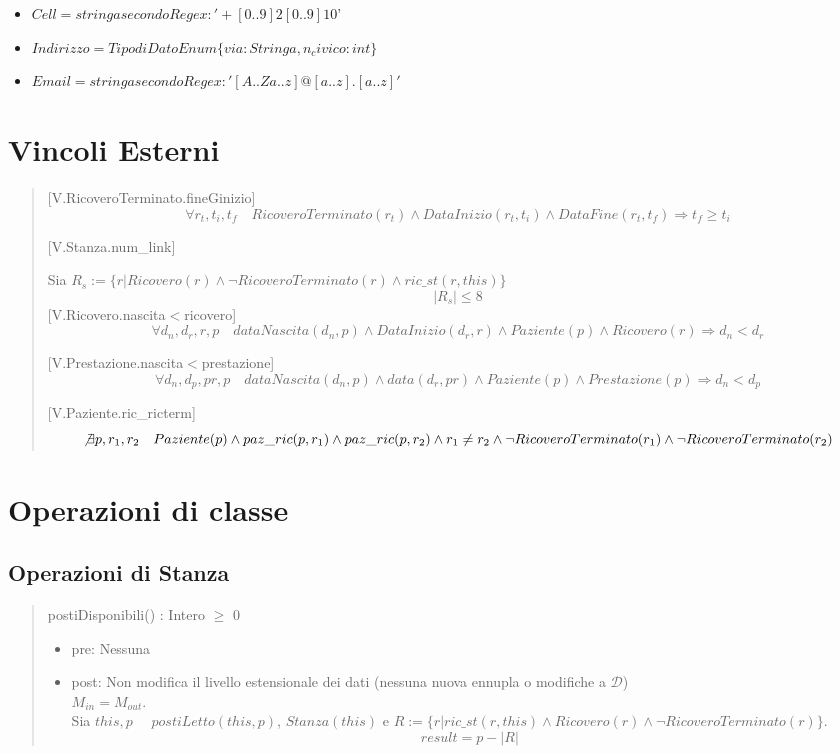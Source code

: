 \documentclass[12pt, letterpaper]{article}
\begin{document}
\begin{itemize}
    \item $Cell= stringa secondo Regex: '+[0..9]{2} [0..9]{10}$'
    \item $Indirizzo= Tipo di Dato Enum \{via: Stringa, n_civico:int \}$
    \item $Email= stringa secondo Regex: '[A..Za..z]@[a..z].[a..z]'$
\end{itemize}
\newpage 
\section{Vincoli Esterni}
\begin{quote}
    [V.RicoveroTerminato.fineGinizio]
    $$\forall r_t,t_i,t_f \quad RicoveroTerminato(r_t) \wedge DataInizio(r_t,t_i) \wedge DataFine(r_t,t_f)\Rightarrow t_f\ge t_i $$

    [V.Stanza.num\_link]

    Sia $R_s := \{ r | Ricovero(r) \land \lnot RicoveroTerminato(r) \land ric\_st(r,this)\}$\\
    $$|R_s| \le 8$$
    [V.Ricovero.nascita$<$ricovero]
    $$ \forall d_n,d_r,r,p \quad dataNascita(d_n,p)\land DataInizio(d_r,r) \land Paziente(p) \land Ricovero(r)\Rightarrow d_n < d_r$$ 
    
    [V.Prestazione.nascita$<$prestazione]
    $$ \forall d_n,d_p,pr,p \quad dataNascita(d_n,p)\land data(d_r,pr) \land Paziente(p) \land Prestazione(p)\Rightarrow d_n < d_p$$  

    [V.Paziente.ric\_ricterm]
    $$ \not\exists p,r_1,r_2 \quad Paziente(p)\land paz\_ric(p,r_1)\land paz\_ric(p,r_2)\land r_1\neq r_2 \land \lnot RicoveroTerminato(r_1)\land \lnot RicoveroTerminato(r_2)$$
\end{quote}
\section{Operazioni di classe}
\subsection{Operazioni di Stanza}
    \begin{quote}
        postiDisponibili() : Intero $\ge$ 0
        \begin{itemize}
            \item pre: Nessuna
            \item post: Non modifica il livello estensionale dei dati (nessuna nuova ennupla o modifiche a $\mathcal{D}$) \\$M_{in}=M_{out}$.
            \\
            Sia $this,p\quad$ $postiLetto(this,p)$, $Stanza(this)$ e $R:=\{r| ric\_st(r,this) \wedge Ricovero(r)\wedge \lnot RicoveroTerminato(r)\}$.\\
            $$result = p - |R|$$
        \end{itemize}
    \end{quote} \newpage
\end{document}
